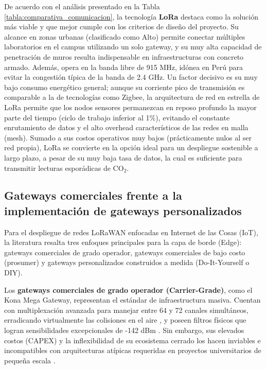 De acuerdo con el análisis presentado en la Tabla \ref{tabla:comparativa_comunicacion}, la tecnología \textbf{LoRa} destaca como la solución más viable y que mejor cumple con los criterios de diseño del proyecto. Su alcance en zonas urbanas (clasificado como Alto) permite conectar múltiples laboratorios en el campus utilizando un solo gateway, y su muy alta capacidad de penetración de muros resulta indispensable en infraestructuras con concreto armado. Además, opera en la banda libre de 915 MHz, idónea en Perú para evitar la congestión típica de la banda de 2.4 GHz. Un factor decisivo es su muy bajo consumo energético general; aunque su corriente pico de transmisión es comparable a la de tecnologías como Zigbee, la arquitectura de red en estrella de LoRa permite que los nodos sensores permanezcan en reposo profundo la mayor parte del tiempo (ciclo de trabajo inferior al 1\%), evitando el constante enrutamiento de datos y el alto overhead característicos de las redes en malla (mesh). Sumado a sus costos operativos muy bajos (prácticamente nulos al ser red propia), LoRa se convierte en la opción ideal para un despliegue sostenible a largo plazo, a pesar de su muy baja tasa de datos, la cual es suficiente para transmitir lecturas esporádicas de CO$_2$.

\subsection{Gateways comerciales frente a la implementación de gateways personalizados}

Para el despliegue de redes LoRaWAN enfocadas en Internet de las Cosas (IoT), la literatura resalta tres enfoques principales para la capa de borde (Edge): gateways comerciales de grado operador, gateways comerciales de bajo costo (prosumer) y gateways personalizados construidos a medida (Do-It-Yourself o DIY).

Los \textbf{gateways comerciales de grado operador (Carrier-Grade)}, como el Kona Mega Gateway, representan el estándar de infraestructura masiva. Cuentan con multiplexación avanzada para manejar entre 64 y 72 canales simultáneos, erradicando virtualmente las colisiones en el aire \cite{nb_gateway_commercial_1}, y poseen filtros físicos que logran sensibilidades excepcionales de -142 dBm \cite{nb_gateway_commercial_4}. Sin embargo, sus elevados costos (CAPEX) y la inflexibilidad de su ecosistema cerrado los hacen inviables e incompatibles con arquitecturas atípicas requeridas en proyectos universitarios de pequeña escala \cite{nb_gateway_commercial_6, nb_gateway_commercial_7}.


